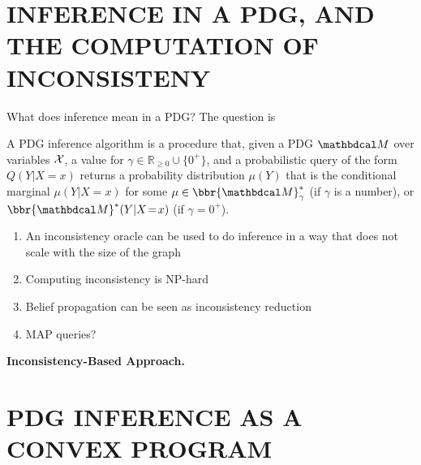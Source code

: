 \documentclass[twoside]{article}
\begin{document}
\section{INFERENCE IN A PDG, AND THE COMPUTATION OF INCONSISTENY}

What does inference mean in a PDG? 
The question is 


\begin{defn}
    A PDG inference algorithm is a procedure that, given a PDG $\dg M$ over variables $\mathcal X$,
     a value for $\gamma \in \mathbb R_{\ge 0} \cup \{0^+\}$, 
     and a probabilistic query of the form $Q(Y|X\!=\!x)$ 
     returns a probability distribution $\mu(Y)$ that is the conditional marginal $\mu(Y|X=x)$ for some $\mu \in \bbr{\dg M}^*_\gamma$  (if $\gamma$ is a number), 
    or $\bbr{\dg M}^*(Y|X\!=\!x)$ (if $\gamma = 0^+$).
\end{defn}



\begin{enumerate}[nosep]
    \item An inconsistency oracle can be used to do inference in a way that does not scale with the size of the graph
    \item Computing inconsistency is NP-hard
    \item Belief propagation can be seen as inconsistency reduction
    \item MAP queries?
\end{enumerate}

\textbf{Inconsistency-Based Approach.}


    

\section{PDG INFERENCE AS A CONVEX PROGRAM}
    \label{sec:reductions}
    
\end{document}

